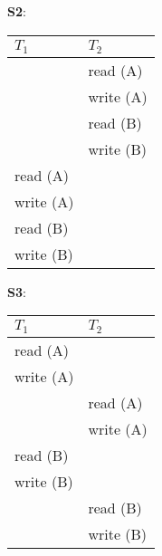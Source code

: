 \documentclass[main.tex]{subfiles}
\begin{document}
    \noindent \textbf{S2}:
    \begin{table}[H]
        \begin{center}
            \begin{tabular}{| p{6cm} | p{6cm} |}
                \hline
                $T_1$ & $T_2$\\
                \hline
                \hline
                & read (A)\\
                \hline
                & write (A)\\
                \hline
                & read (B)\\
                \hline
                & write (B)\\
                \hline
                read (A) &\\
                \hline
                write (A) &\\
                \hline
                read (B)&\\
                \hline
                write (B)&\\
                \hline
            \end{tabular}
        \end{center}
    \end{table}

    \noindent \textbf{S3}:
    \begin{table}[H]
        \begin{center}
            \begin{tabular}{| p{6cm} | p{6cm} |}
                \hline
                $T_1$ & $T_2$\\
                \hline
                \hline
                read (A) &\\
                \hline
                write (A) &\\
                \hline
                & read (A)\\
                \hline
                & write (A)\\
                \hline
                read (B)&\\
                \hline
                write (B)&\\
                \hline
                & read (B)\\
                \hline
                & write (B)\\
                \hline
            \end{tabular}
        \end{center}
    \end{table}
\end{document}
